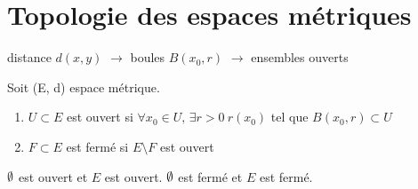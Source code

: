 \section{Topologie des espaces métriques}
distance $d(x, y)$ $\longrightarrow$ boules  $B(x_0, r)$ $\longrightarrow$ ensembles ouverts
\begin{definition}
    Soit (E, d) espace métrique.
    \begin{enumerate}
        \item $U \subset E$ est ouvert si $\forall x_0 \in U, \, \exists r > 0 \: r(x_0)$ tel que $B(x_0, r) \subset U$
        \item $F \subset E$ est fermé si $E \setminus F$ est ouvert
    \end{enumerate}
    $\emptyset$ est ouvert et $E$ est ouvert.  $\emptyset$ est fermé et $E$ est fermé.
\end{definition}
